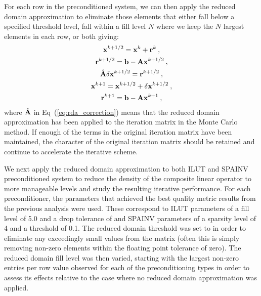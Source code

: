 For each row in the preconditioned system, we can then apply the
reduced domain approximation to eliminate those elements that either
fall below a specified threshold level, fall within a fill level $N$
where we keep the $N$ largest elements in each row, or both giving:
\begin{subequations}
  \begin{gather}
    \mathbf{x}^{k+1/2} = \mathbf{x}^k + \mathbf{r}^k\:,\\
    \mathbf{r}^{k+1/2} = \mathbf{b} - \mathbf{A}\mathbf{x}^{k+1/2}\:,\\
    \hat{\mathbf{A}}\delta\mathbf{x}^{k+1/2} = \mathbf{r}^{k+1/2}\:, 
    \label{eq:rda_correction}\\
    \mathbf{x}^{k+1} = \mathbf{x}^{k+1/2} + \delta \mathbf{x}^{k+1/2}\:,\\
    \mathbf{r}^{k+1} = \mathbf{b} - \mathbf{A}\mathbf{x}^{k+1}\:,
  \end{gather}
  \label{eq:rda_mcsa}
\end{subequations}
where $\hat{\mathbf{A}}$ in Eq~(\ref{eq:rda_correction}) means that the
reduced domain approximation has been applied to the iteration matrix
in the Monte Carlo method. If enough of the terms in the original
iteration matrix have been maintained, the character of the original
iteration matrix should be retained and continue to accelerate the
iterative scheme. 

We next apply the reduced domain approximation to both ILUT and SPAINV
preconditioned system to reduce the density of the composite linear
operator to more manageable levels and study the resulting iterative
performance. For each preconditioner, the parameters that achieved
the best quality metric results from the previous analysis were
used. These correspond to ILUT parameters of a fill level of 5.0 and a
drop tolerance of  and SPAINV parameters of a sparsity level
of 4 and a threshold of 0.1. The reduced domain threshold was set to
 in order to eliminate any exceedingly small values from
the matrix (often this is simply removing non-zero elements within the
floating point tolerance of zero). The reduced domain fill level was
then varied, starting with the largest non-zero entries per row value
observed for each of the preconditioning types in order to assess its
effects relative to the case where no reduced domain approximation was
applied.

